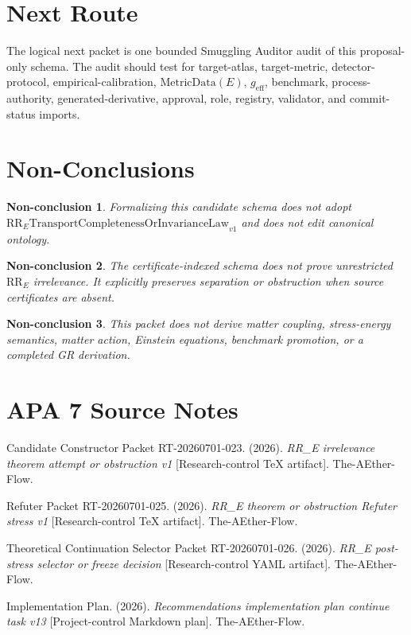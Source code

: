 \documentclass[11pt]{article}
\newcommand{\RRE}{\mathrm{RR}_{E}}
\newcommand{\LawRR}{\mathrm{RR}_{E}\mathrm{TransportCompletenessOrInvarianceLaw}_{v1}}
\newcommand{\MetricData}{\mathrm{MetricData}}
\newcommand{\geff}{g_{\mathrm{eff}}}
\newtheorem{nonconclusion}{Non-conclusion}
\begin{document}
\section{Next Route}

The logical next packet is one bounded Smuggling Auditor audit of this
proposal-only schema. The audit should test for target-atlas, target-metric,
detector-protocol, empirical-calibration, \(\MetricData(E)\), \(\geff\),
benchmark, process-authority, generated-derivative, approval, role, registry,
validator, and commit-status imports.

\section{Non-Conclusions}

\begin{nonconclusion}
Formalizing this candidate schema does not adopt \(\LawRR\) and does not edit
canonical ontology.
\end{nonconclusion}

\begin{nonconclusion}
The certificate-indexed schema does not prove unrestricted \(\RRE\)
irrelevance. It explicitly preserves separation or obstruction when source
certificates are absent.
\end{nonconclusion}

\begin{nonconclusion}
This packet does not derive matter coupling, stress-energy semantics, matter
action, Einstein equations, benchmark promotion, or a completed GR derivation.
\end{nonconclusion}

\section{APA 7 Source Notes}

Candidate Constructor Packet RT-20260701-023. (2026). \emph{RR\_E
irrelevance theorem attempt or obstruction v1} [Research-control TeX
artifact]. The-AEther-Flow.

Refuter Packet RT-20260701-025. (2026). \emph{RR\_E theorem or obstruction
Refuter stress v1} [Research-control TeX artifact]. The-AEther-Flow.

Theoretical Continuation Selector Packet RT-20260701-026. (2026).
\emph{RR\_E post-stress selector or freeze decision} [Research-control YAML
artifact]. The-AEther-Flow.

Implementation Plan. (2026). \emph{Recommendations implementation plan
continue task v13} [Project-control Markdown plan]. The-AEther-Flow.
\end{document}
